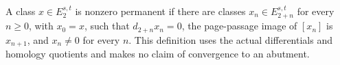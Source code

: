 \begin{definition}
  \label{def:h6-pagewise-permanence}
  \notready
  A class $x\in E_2^{s,t}$ is nonzero permanent if there are classes
  $x_n\in E_{2+n}^{s,t}$ for every $n\ge0$, with $x_0=x$, such that
  $d_{2+n}x_n=0$, the page-passage image of $[x_n]$ is $x_{n+1}$, and
  $x_n\ne0$ for every $n$.  This definition uses the actual differentials
  and homology quotients and makes no claim of convergence to an abutment.
\end{definition}
